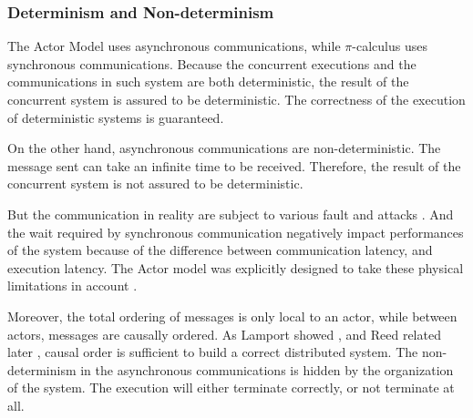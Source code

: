 


\subsubsection{Determinism and Non-determinism}


The Actor Model uses asynchronous communications, while $\pi$-calculus uses synchronous communications.
Because the concurrent executions and the communications in such system are both deterministic, the result of the concurrent system is assured to be deterministic.
The correctness of the execution of deterministic systems is guaranteed.

On the other hand, asynchronous communications are non-deterministic.
The message sent can take an infinite time to be received.
Therefore, the result of the concurrent system is not assured to be deterministic.

But the communication in reality are subject to various fault and attacks \cite{Lamport1982}.
And the wait required by synchronous communication negatively impact performances of the system because of the difference between communication latency, and execution latency.
The Actor model was explicitly designed to take these physical limitations in account \cite{Hewitt1977a}.

Moreover, the total ordering of messages is only local to an actor, while between actors, messages are causally ordered.
As Lamport showed \cite{Lamport1978}, and Reed related later \cite{Reed2012}, causal order is sufficient to build a correct distributed system.
The non-determinism in the asynchronous communications is hidden by the organization of the system.
The execution will either terminate correctly, or not terminate at all.

